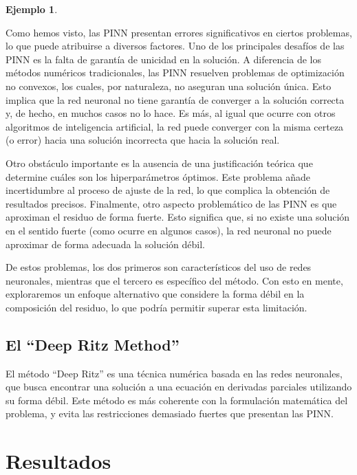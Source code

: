 \documentclass[a4paper,11pt,spanish, twoside, leqno]{tfg-uam}
\theoremstyle{definition}
\newtheorem{exmp}[teor]{Ejemplo}
\begin{document}
\begin{mdframed}
\begin{exmp}
    \end{exmp}
\end{mdframed}

Como hemos visto, las PINN presentan errores significativos en ciertos problemas, lo que puede atribuirse a diversos factores. Uno de los principales desafíos de las PINN es la falta de garantía de unicidad en la solución. A diferencia de los métodos numéricos tradicionales, las PINN resuelven problemas de optimización no convexos, los cuales, por naturaleza, no aseguran una solución única. Esto implica que la red neuronal no tiene garantía de converger a la solución correcta y, de hecho, en muchos casos no lo hace. Es más, al igual que ocurre con otros algoritmos de inteligencia artificial, la red puede converger con la misma certeza (o error) hacia una solución incorrecta que hacia la solución real.

Otro obstáculo importante es la ausencia de una justificación teórica que determine cuáles son los hiperparámetros óptimos. Este problema añade incertidumbre al proceso de ajuste de la red, lo que complica la obtención de resultados precisos. Finalmente, otro aspecto problemático de las PINN es que aproximan el residuo de forma fuerte. Esto significa que, si no existe una solución en el sentido fuerte (como ocurre en algunos casos), la red neuronal no puede aproximar de forma adecuada la solución débil.

De estos problemas, los dos primeros son característicos del uso de redes neuronales, mientras que el tercero es específico del método. Con esto en mente, exploraremos un enfoque alternativo que considere la forma débil en la composición del residuo, lo que podría permitir superar esta limitación.


\section{El ``Deep Ritz Method''}

El método ``Deep Ritz'' es una técnica numérica basada en las redes neuronales, que busca encontrar una solución a una ecuación en derivadas parciales utilizando su forma débil. Este método es más coherente con la formulación matemática del problema, y evita las restricciones demasiado fuertes que presentan las PINN.

\chapter{Resultados}\label{chap3}
\end{document}
